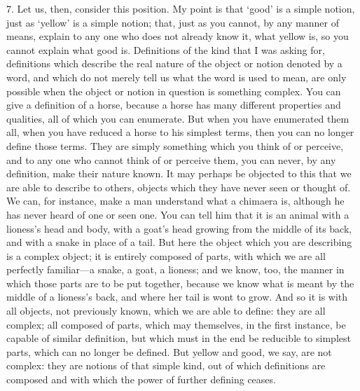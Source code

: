 7. Let us, then, consider this position. My point is that `good' is a
simple notion, just as `yellow' is a simple notion; that, just as you
cannot, by any manner of means, explain to any one who does not
already know it, what yellow is, so you cannot explain what good is.
Definitions of the kind that I was asking for, definitions which
describe the real nature of the object or notion denoted by a word,
and which do not merely tell us what the word is used to mean, are
only possible when the object or notion in question is something
complex. You can give a definition of a horse, because a horse has
many different properties and qualities, all of which you can
enumerate. But when you have enumerated them all, when you have
reduced a horse to his simplest terms, then you can no longer define
those terms. They are simply something which you think of or perceive,
and to any one who cannot think of or perceive them, you can never, by
any definition, make their nature known. It may perhaps be objected to
this that we are able to describe to others, objects which they have
never seen or thought of. We can, for instance, make a man understand
what a chimaera is, although he has never heard of one or seen one.
You can tell him that it is an animal with a lioness's head and body,
with a goat's head growing from the middle of its back, and with a
snake in place of a tail. But here the object which you are describing
is a complex object; it is entirely composed of parts, with which we
are all perfectly familiar---a snake, a goat, a lioness; and we know,
too, the manner in which those parts are to be put together, because
we know what is meant by the middle of a lioness's back, and where her
tail is wont to grow. And so it is with all objects, not previously
known, which we are able to define: they are all complex; all composed
of parts, which may themselves, in the  first instance, be
capable of similar definition, but which must in the end be reducible
to simplest parts, which can no longer be defined. But yellow and
good, we say, are not complex: they are notions of that simple kind,
out of which definitions are composed and with which the power of
further defining ceases.

